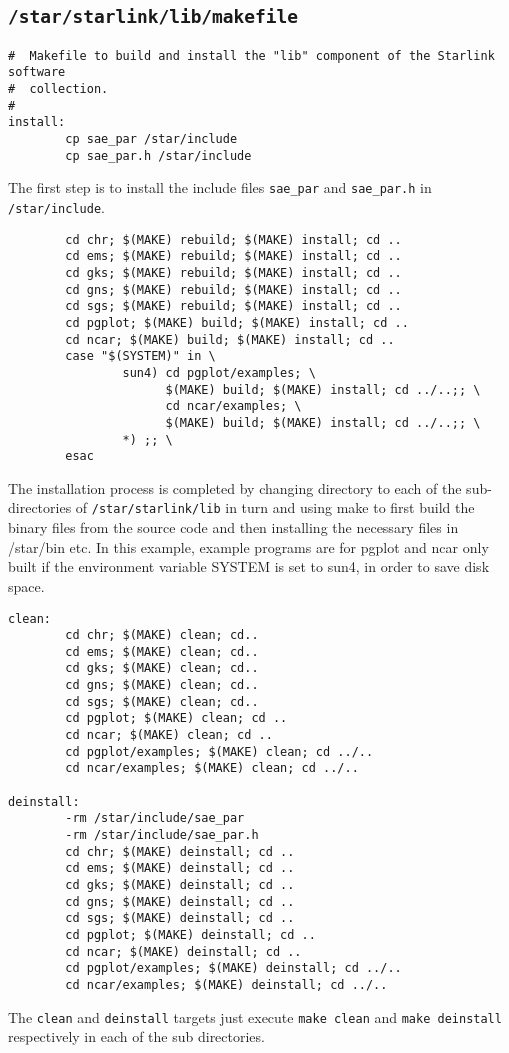 \subsection{\tt /star/starlink/lib/makefile}
\begin{verbatim}
#  Makefile to build and install the "lib" component of the Starlink software
#  collection.
#
install:
        cp sae_par /star/include
        cp sae_par.h /star/include
\end{verbatim}
The first step is to install the include files {\tt sae\_par} and
{\tt sae\_par.h} in {\tt/star/include}.
\begin{verbatim}
        cd chr; $(MAKE) rebuild; $(MAKE) install; cd ..
        cd ems; $(MAKE) rebuild; $(MAKE) install; cd ..
        cd gks; $(MAKE) rebuild; $(MAKE) install; cd ..
        cd gns; $(MAKE) rebuild; $(MAKE) install; cd ..
        cd sgs; $(MAKE) rebuild; $(MAKE) install; cd ..
        cd pgplot; $(MAKE) build; $(MAKE) install; cd ..
        cd ncar; $(MAKE) build; $(MAKE) install; cd ..
        case "$(SYSTEM)" in \
                sun4) cd pgplot/examples; \
                      $(MAKE) build; $(MAKE) install; cd ../..;; \
                      cd ncar/examples; \
                      $(MAKE) build; $(MAKE) install; cd ../..;; \
                *) ;; \
        esac
\end{verbatim}
The installation process is completed by changing directory to each of the
sub-directories of {\tt /star\-/starlink\-/lib} in turn and using make to first
build the binary files from the source code and then installing the necessary
files in {/star/bin} etc. In this example, example programs are for pgplot and
ncar only built if the environment variable SYSTEM is set to sun4, in order to
save disk space.
\begin{verbatim}
clean:
        cd chr; $(MAKE) clean; cd..
        cd ems; $(MAKE) clean; cd..
        cd gks; $(MAKE) clean; cd..
        cd gns; $(MAKE) clean; cd..
        cd sgs; $(MAKE) clean; cd..
        cd pgplot; $(MAKE) clean; cd ..
        cd ncar; $(MAKE) clean; cd ..
        cd pgplot/examples; $(MAKE) clean; cd ../..
        cd ncar/examples; $(MAKE) clean; cd ../..

deinstall:
        -rm /star/include/sae_par
        -rm /star/include/sae_par.h
        cd chr; $(MAKE) deinstall; cd ..
        cd ems; $(MAKE) deinstall; cd ..
        cd gks; $(MAKE) deinstall; cd ..
        cd gns; $(MAKE) deinstall; cd ..
        cd sgs; $(MAKE) deinstall; cd ..
        cd pgplot; $(MAKE) deinstall; cd ..
        cd ncar; $(MAKE) deinstall; cd ..
        cd pgplot/examples; $(MAKE) deinstall; cd ../..
        cd ncar/examples; $(MAKE) deinstall; cd ../..

 \end{verbatim}
The {\tt clean} and {\tt deinstall} targets just execute  {\tt make clean}
and {\tt make deinstall} respectively in each of the sub
directories.

